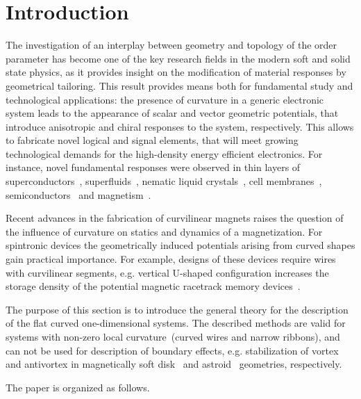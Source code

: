 \section*{Introduction}\label{sec:intro}

The investigation of an interplay between geometry and topology of the order parameter has become one of the key research fields in the modern soft and solid state physics, as it provides insight on the modification of material responses by geometrical tailoring. This result provides means both for fundamental study and technological applications: the presence of curvature in a generic electronic system leads to the appearance of scalar and vector geometric potentials, that introduce anisotropic and chiral responses to the system, respectively. This allows to fabricate novel logical and signal elements, that will meet growing technological demands for the high-density energy efficient electronics. For instance, novel fundamental responses were observed in thin layers of superconductors~\cite{Tempere09,Ying17}, superfluids~\cite{Kuratsuji12}, nematic liquid crystals~\cite{Lopez-Leon11}, cell membranes~\cite{McMahon05}, semiconductors~\cite{Gentile15,Ortix15} and magnetism~\cite{Streubel16}. 

Recent advances in the fabrication of curvilinear magnets \cite{Streubel16a,Fernandez17,Ball17,Sanz-Hernandez18,Huth18,Huth20,Sanz-Hernandez20} raises the question of the influence of curvature on statics and dynamics of a magnetization. For spintronic devices the geometrically induced potentials arising from curved shapes gain practical importance. For example, designs of these devices require wires with curvilinear segments, e.g. vertical U-shaped configuration increases the storage density of the potential magnetic racetrack memory devices~\cite{Parkin08,Zhang15}.

The purpose of this section is to introduce the general theory for the description of the flat curved one-dimensional systems. The described methods are valid for systems with non-zero local curvature~(curved wires and narrow ribbons), and can not be used for description of boundary effects, e.g.  stabilization of vortex and antivortex in magnetically soft disk~\cite{Shinjo00} and astroid~\cite{Shigeto02} geometries, respectively.

The paper is organized as follows. 